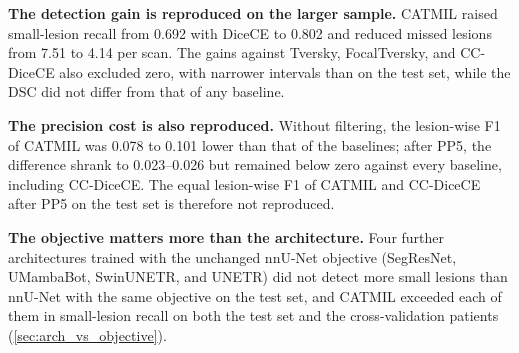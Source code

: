 \begin{table}[t]
\centering
\caption{Paired differences between CATMIL and each baseline on the
cross-validation predictions of the 81 MSLesSeg training scans
(47 patients). Values are CATMIL minus baseline with the 95\% patient-level
bootstrap CI in brackets; bold: CI excludes zero. Lesion F1 is reported without filtering and after removing
components smaller than 5 voxels (PP5).}
\label{tab:oof_paired}
\end{table}

\textbf{The detection gain is reproduced on the larger sample.} CATMIL
raised small-lesion recall from 0.692 with DiceCE to 0.802 and reduced
missed lesions from 7.51 to 4.14 per scan. The gains against Tversky,
FocalTversky, and CC-DiceCE also excluded zero, with narrower intervals
than on the test set, while the DSC did not differ from that of any
baseline.

\textbf{The precision cost is also reproduced.} Without filtering, the
lesion-wise F1 of CATMIL was 0.078 to 0.101 lower than that of the
baselines; after PP5, the difference shrank to 0.023--0.026 but remained
below zero against every baseline, including CC-DiceCE. The equal
lesion-wise F1 of CATMIL and CC-DiceCE after PP5 on the test set is
therefore not reproduced.

\textbf{The objective matters more than the architecture.} Four further
architectures trained with the unchanged nnU-Net objective (SegResNet,
UMambaBot, SwinUNETR, and UNETR) did not detect more small lesions than
nnU-Net with the same objective on the test set, and CATMIL exceeded each of them in
small-lesion recall on both the test set and the cross-validation patients
(\cref{sec:arch_vs_objective}).
